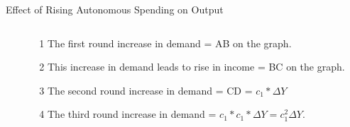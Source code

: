 \documentclass[shownotes,11pt, aspectratio=169]{beamer}
\newenvironment{wideitemize}{\itemize\addtolength{\itemsep}{10pt}}{\enditemize}
\begin{document}
\begin{frame}{Effect of Rising Autonomous Spending on Output}
\begin{columns}[T] %
\begin{column}{.44\textwidth}
\end{column}%
\hfill
\begin{column}{.52\textwidth}
  \begin{wideitemize}
    \item[1] The first round increase in demand = AB on the graph.
    \item[2] This increase in demand leads to rise in income = BC on the graph.
    \item[3] The second round increase in demand = CD = $c_1*\Delta Y$
    \item[4] The third round increase in demand = $c_1*c_1*\Delta Y = c_1^2\Delta Y$.
  \end{wideitemize}
\end{column}%
\end{columns}
\end{frame}
\end{document}
